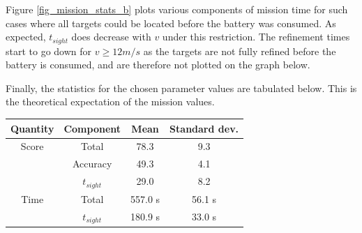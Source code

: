 Figure \ref{fig_mission_stats_b} plots various components of mission time for such cases where all targets could be located before the battery was consumed. As expected, $t_{sight}$ does decrease with $v$ under this restriction. The refinement times start to go down for $v \geq 12 m/s$ as the targets are not fully refined before the battery is consumed, and are therefore not plotted on the graph below.

Finally, the statistics for the chosen parameter values are tabulated below. This is the theoretical expectation of the mission values.

\begin{center}
    \begin{tabular}{c | c | c | c  }
    \hline
    Quantity & Component & Mean & Standard dev. \\
    \hline
    Score & Total & 78.3 & 9.3 \\
    		  & Accuracy & 49.3 & 4.1 \\
     	  & $t_{sight}$ & 29.0 & 8.2 \\ \hline
    Time  & Total & 557.0 s & 56.1 s \\
     	  & $t_{sight}$ & 180.9 s & 33.0 s \\ \hline
    \end{tabular}
\end{center}
